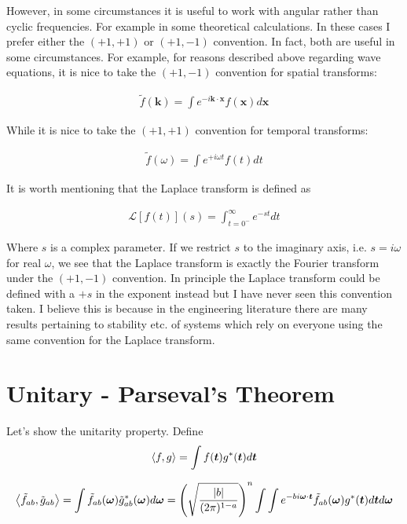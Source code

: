 \documentclass[12pt]{article}
\newcommand{\bv}[1]{\boldsymbol{#1}}
\begin{document}
However, in some circumstances it is useful to work with angular rather than cyclic frequencies. For example in some theoretical calculations. In these cases I prefer either the $(+1, +1)$ or $(+1, -1)$ convention. In fact, both are useful in some circumstances. For example, for reasons described above regarding wave equations, it is nice to take the $(+1, -1)$ convention for spatial transforms:

\begin{align}
\tilde{f}(\bv{k}) = \int e^{-i \bv{k} \cdot \bv{x}} f(\bv{x})d\bv{x}
\end{align}

While it is nice to take the $(+1, +1)$ convention for temporal transforms:

\begin{align}
\tilde{f}(\omega) = \int e^{+i \omega t} f(t) dt
\end{align}

It is worth mentioning that the Laplace transform is defined as

\begin{align}
\mathcal{L}[f(t)](s) = \int_{t=0^-}^{\infty} e^{-st} dt
\end{align}

Where $s$ is a complex parameter. If we restrict $s$ to the imaginary axis, i.e. $s=i\omega$ for real $\omega$, we see that the Laplace transform is exactly the Fourier transform under the $(+1,-1)$ convention. In principle the Laplace transform could be defined with a $+s$ in the exponent instead but I have never seen this convention taken. I believe this is because in the engineering literature there are many results pertaining to stability etc. of systems which rely on everyone using the same convention for the Laplace transform. 

\section{Unitary - Parseval's Theorem}

Let's show the unitarity property. Define
\begin{align}
\Braket{f,g} = \int f(\bv{t}) g^*(\bv{t}) d\bv{t}
\end{align}

\begin{align}
\Braket{\tilde{f}_{ab},\tilde{g}_{ab}}= \int \tilde{f}_{ab}(\bv{\omega}) \tilde{g}_{ab}^*(\bv{\omega}) d\bv{\omega} = \left(\sqrt{\frac{|b|}{(2\pi)^{1-a}}}\right)^n \int \int e^{-b i \bv{\omega} \cdot \bv{t}} \tilde{f}_{ab}(\bv{\omega}) g^*(\bv{t}) d\bv{t} d\bv{\omega}
\end{align}
\end{document}
